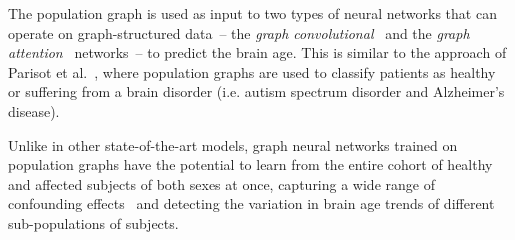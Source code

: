 The population graph is used as input to two types of neural networks that can operate on graph-structured data~– the \textit{graph convolutional}~\cite{kipf2017semi} and the \textit{graph attention}~\cite{velickovic2018graph} networks~– to predict the brain age. This is similar to the approach of Parisot et al.~\cite{parisot2017spectral,parisot2018disease}, where population graphs are used to classify patients as healthy or suffering from a brain disorder (i.e. autism spectrum disorder and Alzheimer's disease).

Unlike in other state-of-the-art models, graph neural networks trained on population graphs have the potential to learn from the entire cohort of healthy and affected subjects of both sexes at once, capturing a wide range of confounding effects~\cite{ruigrok2014meta, lancet2016sex} and detecting the variation in brain age trends of different sub-populations of subjects. 

 
 





